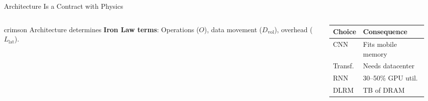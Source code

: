 \documentclass[aspectratio=169, 12pt]{beamer}
\begin{document}
\begin{frame}{Architecture Is a Contract with Physics}
\begin{columns}[T]
\begin{column}{0.55\textwidth}
    \vspace{0.1cm}
    \begin{mlsyscard}{crimson}
    Architecture determines \textbf{Iron Law terms}:
    Operations ($O$), data movement ($D_{\text{vol}}$), overhead ($L_{\text{lat}}$).
    \end{mlsyscard}
  \end{column}
  \begin{column}{0.42\textwidth}
    \renewcommand{\arraystretch}{1.15}
    {\footnotesize
    \begin{tabular}{@{}ll@{}}
      \toprule
      \textbf{Choice} & \textbf{Consequence} \\
      \midrule
      CNN    & Fits mobile memory \\
      Transf.& Needs datacenter \\
      RNN    & 30--50\% GPU util. \\
      DLRM   & TB of DRAM \\
      \bottomrule
    \end{tabular}
    }
  \end{column}
\end{columns}

\end{frame}
\end{document}
